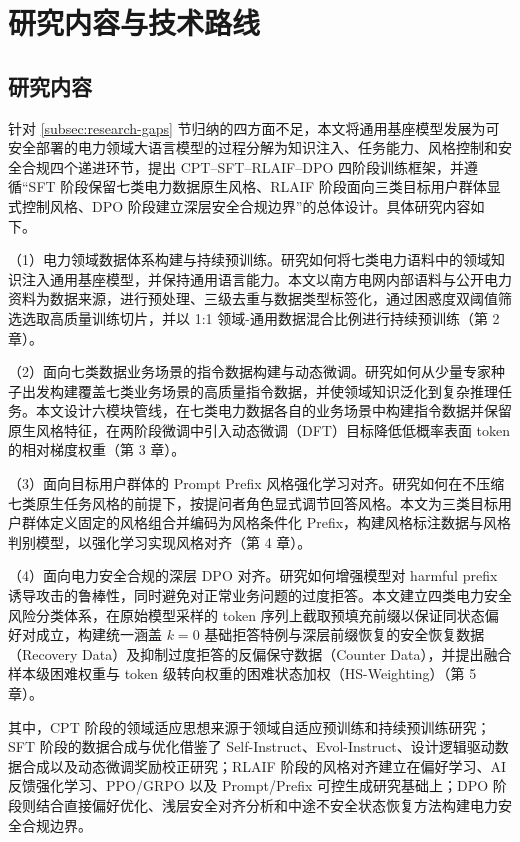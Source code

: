 \documentclass[fontset=fandol,type=master,campus=shenzhen,etitleauto=true]{hithesisbook}
\begin{document}
\section{研究内容与技术路线}\label{ux7814ux7a76ux5185ux5bb9ux4e0eux65b9ux6cd5}

\subsection{研究内容}

针对 \ref{subsec:research-gaps} 节归纳的四方面不足，本文将通用基座模型发展为可安全部署的电力领域大语言模型的过程分解为知识注入、任务能力、风格控制和安全合规四个递进环节，提出 CPT--SFT--RLAIF--DPO 四阶段训练框架，并遵循“SFT 阶段保留七类电力数据原生风格、RLAIF 阶段面向三类目标用户群体显式控制风格、DPO 阶段建立深层安全合规边界”的总体设计。具体研究内容如下。

（1）电力领域数据体系构建与持续预训练。研究如何将七类电力语料中的领域知识注入通用基座模型，并保持通用语言能力。本文以南方电网内部语料与公开电力资料为数据来源，进行预处理、三级去重与数据类型标签化，通过困惑度双阈值筛选选取高质量训练切片，并以 1:1 领域-通用数据混合比例进行持续预训练（第 2 章）。

（2）面向七类数据业务场景的指令数据构建与动态微调。研究如何从少量专家种子出发构建覆盖七类业务场景的高质量指令数据，并使领域知识泛化到复杂推理任务。本文设计六模块管线，在七类电力数据各自的业务场景中构建指令数据并保留原生风格特征，在两阶段微调中引入动态微调（DFT）目标降低低概率表面 token 的相对梯度权重（第 3 章）。

（3）面向目标用户群体的 Prompt Prefix 风格强化学习对齐。研究如何在不压缩七类原生任务风格的前提下，按提问者角色显式调节回答风格。本文为三类目标用户群体定义固定的风格组合并编码为风格条件化 Prefix，构建风格标注数据与风格判别模型，以强化学习实现风格对齐（第 4 章）。

（4）面向电力安全合规的深层 DPO 对齐。研究如何增强模型对 harmful prefix 诱导攻击的鲁棒性，同时避免对正常业务问题的过度拒答。本文建立四类电力安全风险分类体系，在原始模型采样的 token 序列上截取预填充前缀以保证同状态偏好对成立，构建统一涵盖 $k=0$ 基础拒答特例与深层前缀恢复的安全恢复数据（Recovery Data）及抑制过度拒答的反偏保守数据（Counter Data），并提出融合样本级困难权重与 token 级转向权重的困难状态加权（HS-Weighting）（第 5 章）。

其中，CPT 阶段的领域适应思想来源于领域自适应预训练和持续预训练研究\cite{ref6,ref52}；SFT 阶段的数据合成与优化借鉴了 Self-Instruct、Evol-Instruct、设计逻辑驱动数据合成以及动态微调奖励校正研究\cite{ref24,ref25,ref53,ref54,ref82}；RLAIF 阶段的风格对齐建立在偏好学习、AI 反馈强化学习、PPO/GRPO 以及 Prompt/Prefix 可控生成研究基础上\cite{ref30,ref31,ref32,ref44,ref90,ref33,ref34,ref35,ref36,ref37,ref38,ref39}；DPO 阶段则结合直接偏好优化、浅层安全对齐分析和中途不安全状态恢复方法构建电力安全合规边界\cite{ref40,ref44,ref45,ref46,ref47,ref48,ref83,ref84}。
\end{document}
